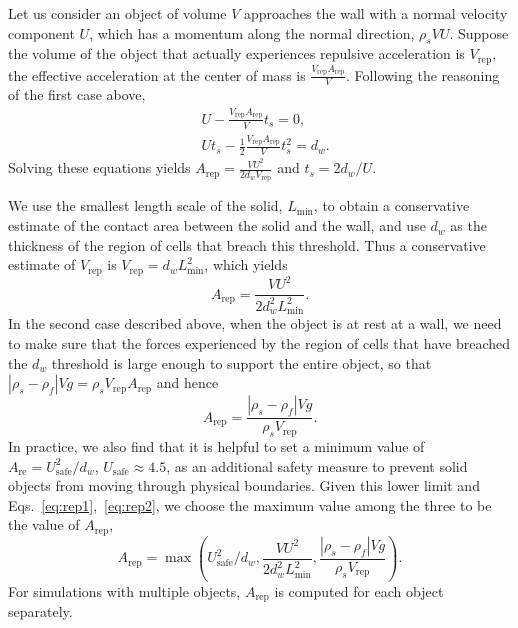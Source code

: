 \documentclass[times, 10pt]{article}
\begin{document}
Let us consider an object of volume $V$ approaches the wall with a normal velocity component $U$, which has a momentum along the normal direction, $\rho_s V U$.
Suppose the volume of the object that actually experiences repulsive acceleration is $V_\text{rep}$,
the effective acceleration at the center of mass is $\frac{V_\text{rep} A_\text{rep} }{ V}$.
Following the reasoning of the first case above,
\begin{equation}
\begin{aligned}
&U  - \frac{V_\text{rep} A_\text{rep} }{ V} t_s = 0, \\
&U t_s - \frac12 \frac{V_\text{rep} A_\text{rep} }{ V} t_s^2 = d_w.
\end{aligned}
\end{equation}
Solving these equations yields $A_\text{rep} = \frac{V U^2}{2d_wV_\text{rep}}$ and $t_s = 2d_w/U$.

We use the smallest length scale of the solid, $L_\text{min}$,  to obtain a conservative estimate of the contact area between the solid and the wall, and use $d_w$ as the thickness of the region of cells that breach this threshold.
Thus a conservative estimate of $V_\text{rep}$ is $V_\text{rep} = d_w L^2_\text{min}$, which yields
\begin{equation}
A_\text{rep} =\frac{V U^2}{2d_w^2 L^2_\text{min}}.
\label{eq:rep1}
\end{equation}
In the second case described above, when the object is at rest at a wall, we need to make sure that the forces experienced by the region of cells that have breached the $d_w$ threshold is large enough to support the entire object, so that $|\rho_s - \rho_f| Vg = \rho_s V_\text{rep} A_\text{rep}$ and hence
\begin{equation}
	A_\text{rep} = \frac{|\rho_s - \rho_f| Vg}{ \rho_s V_\text{rep}}.
	\label{eq:rep2}
\end{equation}
In practice, we also find that it is helpful to set a minimum value of $A_\text{re} = U^2_\text{safe}/d_w$, $U_\text{safe} \approx 4.5$, as an additional safety measure to prevent solid objects from moving through physical boundaries. Given this lower limit and Eqs.~\eqref{eq:rep1},~\eqref{eq:rep2}, we choose the maximum value among the three to be the value of $A_\text{rep}$,
\begin{equation}
 A_\text{rep} = \max \left( U^2_\text{safe}/d_w, \frac{V U^2}{2d_w^2 L^2_\text{min}}, \frac{|\rho_s - \rho_f| Vg}{ \rho_s V_\text{rep}} \right).
\end{equation}
For simulations with multiple objects, $A_\text{rep}$ is computed for each object separately.
\end{document}
